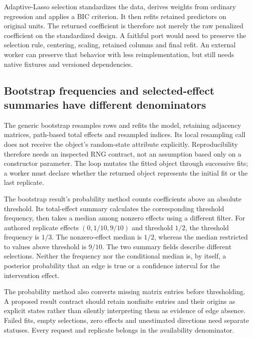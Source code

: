 Adaptive-Lasso selection standardizes the data, derives weights from
ordinary regression and applies a BIC criterion. It then refits retained
predictors on original units. The returned coefficient is therefore not
merely the raw penalized coefficient on the standardized design. A faithful
port would need to preserve the selection rule, centering, scaling,
retained columns and final refit. An external worker can preserve that
behavior with less reimplementation, but still needs native fixtures and
versioned dependencies.\citep{exec24_lingam_source,exec24_lingam_choice}

\subsection{Bootstrap frequencies and selected-effect summaries have different denominators}
The generic bootstrap resamples rows and refits the model, retaining
adjacency matrices, path-based total effects and resampled indices.
Its local resampling call does not receive the object's random-state
attribute explicitly. Reproducibility therefore needs an inspected RNG
contract, not an assumption based only on a constructor parameter.
The loop mutates the fitted object through successive fits; a worker must
declare whether the returned object represents the initial fit or the
last replicate.\citep{exec24_lingam_source}

The bootstrap result's probability method counts coefficients above an
absolute threshold. Its total-effect summary calculates the corresponding
threshold frequency, then takes a median among nonzero effects using a
different filter. For authored replicate effects $(0,1/10,9/10)$ and
threshold $1/2$, the threshold frequency is $1/3$. The nonzero-effect
median is $1/2$, whereas the median restricted to values above threshold
is $9/10$. The two summary fields describe different selections.
Neither the frequency nor the conditional median is, by itself, a
posterior probability that an edge is true or a confidence interval for
the intervention effect.\citep{exec24_lingam_source,exec24_lingam_choice}

The probability method also converts missing matrix entries before
thresholding. A proposed result contract should retain nonfinite entries
and their origins as explicit states rather than silently interpreting
them as evidence of edge absence. Failed fits, empty selections, zero
effects and unestimated directions need separate statuses. Every request
and replicate belongs in the availability denominator.
\citep{exec24_lingam_source,exec24_lingam_choice}

